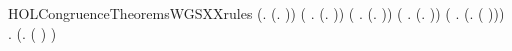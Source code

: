 \newcommand{\HOLCongruenceTheoremsWGSXXind}{\UseVerbatim{HOLCongruenceTheoremsWGSXXind}}
\begin{SaveVerbatim}{HOLCongruenceTheoremsWGSXXrules}
\HOLTokenTurnstile{} (\HOLSymConst{\HOLTokenForall{}}.  (\HOLTokenLambda{}. )) \HOLSymConst{\HOLTokenConj{}} (\HOLSymConst{\HOLTokenForall{}} .   \HOLSymConst{\HOLTokenImp{}}  (\HOLTokenLambda{}.  )) \HOLSymConst{\HOLTokenConj{}}
   (\HOLSymConst{\HOLTokenForall{}}   .
          \HOLSymConst{\HOLTokenConj{}}   \HOLSymConst{\HOLTokenImp{}}
         (\HOLTokenLambda{}.   \HOLSymConst{\ensuremath{+}}  )) \HOLSymConst{\HOLTokenConj{}}
   (\HOLSymConst{\HOLTokenForall{}} .   \HOLSymConst{\HOLTokenConj{}}   \HOLSymConst{\HOLTokenImp{}}  (\HOLTokenLambda{}.   \HOLSymConst{\ensuremath{\parallel}}  )) \HOLSymConst{\HOLTokenConj{}}
   (\HOLSymConst{\HOLTokenForall{}} .   \HOLSymConst{\HOLTokenImp{}}  (\HOLTokenLambda{}. \HOLConst{\ensuremath{\nu}}  ( ))) \HOLSymConst{\HOLTokenConj{}}
   \HOLSymConst{\HOLTokenForall{}} .   \HOLSymConst{\HOLTokenImp{}}  (\HOLTokenLambda{}.  ( ) )
\end{SaveVerbatim}
\newcommand{\HOLCongruenceTheoremsWGSXXrules}{\UseVerbatim{HOLCongruenceTheoremsWGSXXrules}}
